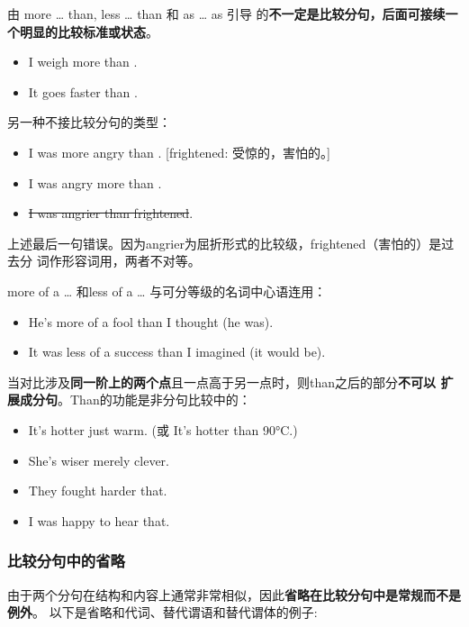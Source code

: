 由 more \ldots{} than, less \ldots{} than 和 as \ldots{} as 引导
的\textbf{不一定是比较分句，后面可接续一个明显的比较标准或状态}。
\begin{itemize}
\item I weigh more than .

\item It goes faster than .

\end{itemize}

另一种不接比较分句的类型：
\begin{itemize}
\item I was more angry than . [frightened:
   受惊的，害怕的。]
\item I was angry more than .

\item \sout{I was angrier than frightened}.
\end{itemize}
上述最后一句错误。因为angrier为屈折形式的比较级，frightened（害怕的）是过去分
词作形容词用，两者不对等。

more of a \ldots{} 和less of a \ldots{} 与可分等级的名词中心语连用：
\begin{itemize}
\item He's more of a fool than I thought (he was).

\item It was less of a success than I imagined (it would be).
\end{itemize}

当对比涉及\textbf{同一阶上的两个点}且一点高于另一点时，则than之后的部分\textbf{不可以
扩展成分句}。Than的功能是非分句比较中的：
\begin{itemize}
\item It's hotter  just warm. (或 It's hotter than 90°C.)
\item She's wiser  merely clever.
\item They fought harder  that.
\item I was  happy to hear that.
\end{itemize}

\subsubsection{比较分句中的省略}

由于两个分句在结构和内容上通常非常相似，因此\textbf{省略在比较分句中是常规而不是例外}。
以下是省略和代词、替代谓语和替代谓体的例子:

